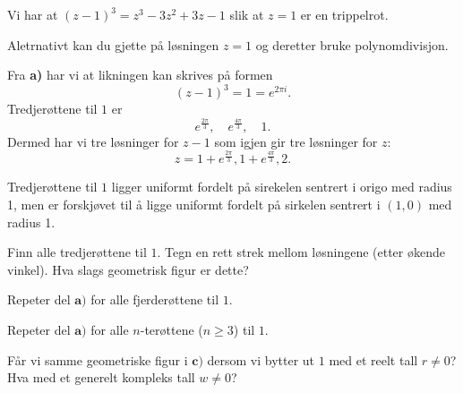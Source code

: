 \begin{losning}

\begin{punkt}
Vi har at $(z-1)^3=z^3-3z^2+3z-1$ slik at $z=1$ er en trippelrot.

\noindent
Aletrnativt kan du gjette på løsningen $z=1$ og deretter bruke polynomdivisjon.
\end{punkt}

\begin{punkt}


Fra \textbf{a)} har vi at likningen kan skrives på formen $$(z-1)^3=1=e^{2\pi i}.$$ Tredjerøttene til $1$ er $$e^{\frac{2\pi}{3}}, \quad e^{\frac{4\pi}{3}},\quad 1.$$ Dermed har vi tre løsninger for $z-1$ som igjen gir tre løsninger for $z$: $$z=1+e^{\frac{2\pi}{3}},1+e^{\frac{4\pi}{3}},2.$$

\noindent
Tredjerøttene til $1$ ligger uniformt fordelt på sirekelen sentrert i origo med radius 1, men er forskjøvet til å ligge uniformt fordelt på sirkelen sentrert i $(1,0)$ med radius 1.


\end{punkt}

\end{losning}

\begin{oppgave}

\begin{punkt}
Finn alle tredjerøttene til $1$. Tegn en rett strek mellom løsningene (etter økende vinkel). Hva slags geometrisk figur er dette?
\end{punkt}

\begin{punkt}
Repeter del $\textbf{a)}$ for alle fjerderøttene til $1$.
\end{punkt}


\begin{punkt}
Repeter del $\textbf{a)}$ for alle $n$-terøttene ($n\geq 3$) til $1$.
\end{punkt}

\begin{punkt}
Får vi samme geometriske figur i $\textbf{c)}$ dersom vi bytter ut $1$ med et reelt tall $r \neq 0$? Hva med et generelt kompleks tall $w\neq 0$?
\end{punkt}
\end{oppgave}


